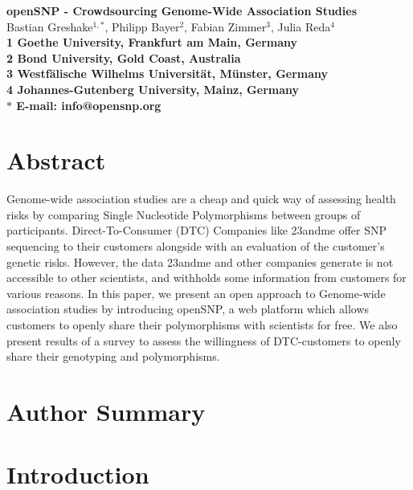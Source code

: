\documentclass[10pt]{article}
\date{}
\begin{document}
\begin{flushleft}
{\Large
\textbf{openSNP - Crowdsourcing Genome-Wide Association Studies}
}
\\
Bastian Greshake$^{1,\ast}$, 
Philipp Bayer$^{2}$, 
Fabian Zimmer$^{3}$,
Julia Reda$^{4}$
\\
\bf{1} Goethe University, Frankfurt am Main, Germany
\\
\bf{2} Bond University, Gold Coast, Australia
\\
\bf{3} Westf\"alische Wilhelms Universit\"at, M\"unster, Germany
\\
\bf{4} Johannes-Gutenberg University, Mainz, Germany
\\
$\ast$ E-mail: info@opensnp.org
\end{flushleft}

\section*{Abstract}
Genome-wide association studies are a cheap and quick way of assessing health risks by comparing Single Nucleotide Polymorphisms 
between groups of participants. Direct-To-Consumer (DTC) Companies like 23andme offer SNP sequencing to their customers alongside 
with an evaluation of the customer's genetic risks. However, the data 23andme and other companies generate is not accessible 
to other scientists, and withholds some information from customers for various reasons. In this paper, we present an open 
approach to Genome-wide association studies by introducing openSNP, a web platform which allows customers to openly share 
their polymorphisms with scientists for free. We also present results of a survey to assess the willingness of DTC-customers 
to openly share their genotyping and polymorphisms.


\section*{Author Summary}

\section*{Introduction}
\end{document}
